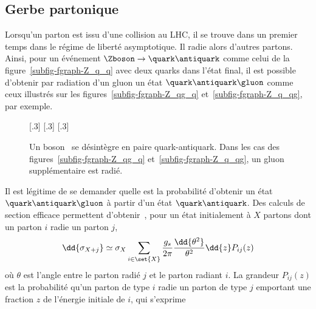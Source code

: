 \subsection{Gerbe partonique}\label{chapter-JERC-section-jets-subsec-gerbe-partonique}
Lorsqu'un parton est issu d'une collision au LHC, il se trouve dans un premier temps dans le régime de liberté asymptotique. Il radie alors d'autres partons. Ainsi, pour un événement $\Zboson\to\quark\antiquark$ comme celui de la figure~\ref{subfig-fgraph-Z_q_q} avec deux quarks dans l'état final, il est possible d'obtenir par radiation d'un gluon un état $\quark\antiquark\gluon$ comme ceux illustrés sur les figures~\ref{subfig-fgraph-Z_qg_q} et~\ref{subfig-fgraph-Z_q_qg}, par exemple.
\begin{figure}[h]
\centering\vspace{\baselineskip}
\subcaptionbox{\label{subfig-fgraph-Z_q_q}}[.3\textwidth]
{\vspace{\baselineskip}}
\hfill
\subcaptionbox{\label{subfig-fgraph-Z_qg_q}}[.3\textwidth]
{\vspace{\baselineskip}}
\hfill
\subcaptionbox{\label{subfig-fgraph-Z_q_qg}}[.3\textwidth]
{\vspace{\baselineskip}}
\caption[Un boson \Zboson\ se désintègre en paire quark-antiquark.]{Un boson \Zboson\ se désintègre en paire quark-antiquark. Dans les cas des figures~\ref{subfig-fgraph-Z_qg_q} et~\ref{subfig-fgraph-Z_q_qg}, un gluon supplémentaire est radié.}
\label{fig-fgraph-Z_q_q_xg}
\end{figure}
\par Il est légitime de se demander quelle est la probabilité d'obtenir un état $\quark\antiquark\gluon$ à partir d'un état $\quark\antiquark$.
Des calculs de section efficace permettent d'obtenir~\cite{salam2010elements}, pour un état initialement à $X$ partons dont un parton $i$ radie un parton $j$,
\begin{equation}
\dd{\sigma_{X+j}} \simeq \sigma_{X} \sum_{i\in\set{X}} \frac{g_s}{2\pi} \frac{\dd{\theta^2}}{\theta^2} \dd{z} P_{ij}(z)
\end{equation}
où $\theta$ est l'angle entre le parton radié $j$ et le parton radiant $i$. La grandeur $P_{ij}(z)$ est la probabilité qu'un parton de type $i$ radie un parton de type $j$ emportant une fraction $z$ de l'énergie initiale de $i$, qui s'exprime
